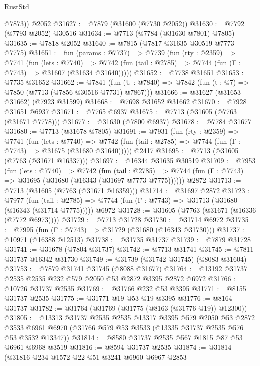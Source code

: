 \begin{lexlean}{RustStd}
\begin{coremodule}
        @7873))
    @2052
@31627 := @7879 (@31600 (@7730 @2052))
@31630 := @7792 (@7793 @2052) @30516
@31634 := @7713 (@7784 (@31630 @7801) @7805)
@31635 := @7818 @2052
@31640 := @7815 (@7817 @31635 @30519 @7773 @7775)
@31651 := fun (params : @7737) =>
  @7739
    (fun (rty : @2359) =>
    @7741
      (fun (lets : @7740) =>
      @7742 (fun (tail : @2785) => @7744 (fun (Γ : @7743) => @31607 (@31634 @31640)))))
@31652 := @7738 @31651
@31653 := @7735 @31652
@31662 := @7841
    (fun (U : @7840) => @7842 (fun (t : @7) => @7850 (@7713 (@7856 @30516 @7731) @7867)))
@31666 := @31627 (@31653 @31662) (@7923 @31599)
@31668 := @7698 @31652 @31662
@31670 := @7928 @31651 @6937
@31671 := @7765 @6937
@31675 := @7713 (@31605 (@7763 (@31671 @7778)))
@31677 := @31630 (@7800 @6937)
@31678 := @7784 @31677
@31680 := @7713 (@31678 @7805)
@31691 := @7931
    (fun (rty : @2359) =>
    @7741
      (fun (lets : @7740) =>
      @7742 (fun (tail : @2785) => @7744 (fun (Γ : @7743) => @31675 (@31680 @31640)))))
    @2417
@31695 := @7713 (@31605 (@7763 (@31671 @16337)))
@31697 := @16344 @31635 @30519
@31709 := @7953
    (fun (lets : @7740) =>
    @7742
      (fun (tail : @2785) =>
      @7744 (fun (Γ : @7743) => @31695 (@31680 (@16343 (@31697 @7773 @7775))))))
    @2872
@31713 := @7713 (@31605 (@7763 (@31671 @16359)))
@31714 := @31697 @2872
@31723 := @7977
    (fun (tail : @2785) => @7744 (fun (Γ : @7743) => @31713 (@31680 (@16343 (@31714 @7775)))))
    @6972
@31728 := @31605 (@7763 (@31671 (@16336 (@7772 @6973))))
@31729 := @7713 @31728
@31730 := @31714 @6972
@31735 := @7995 (fun (Γ : @7743) => @31729 (@31680 (@16343 @31730)))
@31737 := @10971 (@16388 @12513)
@31738 := @31735 @31737
@31739 := @7879 @31728
@31741 := @31678 (@7804 @31737)
@31742 := @7713 @31741
@31745 := @7811 @31737 @16342 @31730
@31749 := @31739 (@31742 @31745) (@8083 @31604)
@31753 := @7879 @31741 @31745 (@8088 @31677)
@31764 := @13192 @31737 @2535 @2535 @232 @579 @2050 @53 @2872 @3395 @2872 @6972
@31766 := @10726 @31737 @2535
@31769 := @31766 @232 @53 @3395
@31771 := @8155 @31737 @2535
@31775 := @31771 @19 @53 @19 @3395
@31776 := @8164 @31737
@31782 := @31764 (@31769 (@31775 (@8163 (@31776 @19)) @12300))
@31805 := @13313
    @31737
    @2535
    @2535
    @13317
    @3395
    @579
    @2050
    @53
    @2872
    @3533
    @6961
    @6970
    (@31766 @579 @53 @3533 (@13335 @31737 @2535 @576 @53 @3532 @13347))
@31814 := @8580 @31737 @2535 @567 @1815 @87 @53 @6961 @6968 @3519
@31816 := @8594 @31737 @2535
@31874 := @31814
    (@31816
      @234
      @1572
      @22
      @51
      @3241
      @6960
      @6967
      @2853

\end{coremodule}
\end{lexlean}
